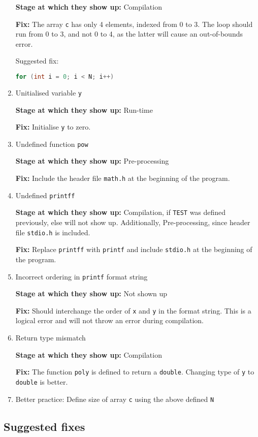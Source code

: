 \begin{enumerate}
            \textbf{Stage at which they show up:}
            Compilation

            \textbf{Fix:}
            The array \texttt{c} has only 4 elements, indexed from 0 to 3.
            The loop should run from 0 to 3, and not 0 to 4, as the latter will cause an out-of-bounds error.

            Suggested fix:
            \begin{lstlisting}[language=C, frame=single]
for (int i = 0; i < N; i++)
            \end{lstlisting}

      \item Unitialised variable \texttt{y}

            \textbf{Stage at which they show up:}
            Run-time

            \textbf{Fix:}
            Initialise \texttt{y} to zero.

      \item Undefined function \texttt{pow}

            \textbf{Stage at which they show up:}
            Pre-processing

            \textbf{Fix:}
            Include the header file \texttt{math.h} at the beginning of the program.

      \item Undefined \texttt{printff}

            \textbf{Stage at which they show up:}
            Compilation, if \texttt{TEST} was defined previously, else will not show up.
            Additionally, Pre-processing, since header file \texttt{stdio.h} is included.

            \textbf{Fix:}
            Replace \texttt{printff} with \texttt{printf} and include \texttt{stdio.h} at the beginning of the program.

      \item Incorrect ordering in \texttt{printf} format string

            \textbf{Stage at which they show up:}
            Not shown up

            \textbf{Fix:}
            Should interchange the order of \texttt{x} and \texttt{y} in the format string.
            This is a logical error and will not throw an error during compilation.

      \item Return type mismatch

            \textbf{Stage at which they show up:}
            Compilation

            \textbf{Fix:}
            The function \texttt{poly} is defined to return a \texttt{double}.
            Changing type of \texttt{y}  to \texttt{double} is better.

      \item Better practice: Define size of array \texttt{c} using the above defined \texttt{N}

\end{enumerate}

\clearpage
\subsection*{Suggested fixes}


